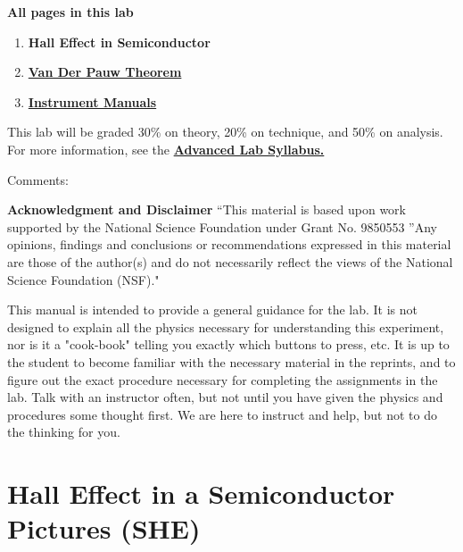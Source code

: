 \documentclass{../lab}
\begin{document}
\noindent\textbf{All pages in this lab}

\begin{enumerate}
    \item \textbf{Hall Effect in Semiconductor}

    \item \href{http://experimentationlab.berkeley.edu/node/105}{\textbf{Van Der Pauw Theorem}}
    
    \item \href{http://experimentationlab.berkeley.edu/node/106}{\textbf{Instrument Manuals}}
\end{enumerate}

This lab will be graded 30\% on theory, 20\% on technique, and 50\% on analysis. For more information, see the \href{http://experimentationlab.berkeley.edu/syllabus}{\textbf{Advanced Lab Syllabus.}}

Comments: \Feedback

\textbf{Acknowledgment and Disclaimer} ``This material is based upon work supported by the National Science Foundation under Grant No. 9850553 ''Any opinions, findings and conclusions or recommendations expressed in this material are those of the author(s) and do not necessarily reflect the views of the National Science Foundation (NSF)."

This manual is intended to provide a general guidance for the lab. It is not designed to explain all the physics necessary for understanding this experiment, nor is it a "cook-book" telling you exactly which buttons to press, etc. It is up to the student to become familiar with the necessary material in the reprints, and to figure out the exact procedure necessary for completing the assignments in the lab. Talk with an instructor often, but not until you have given the physics and procedures some thought first. We are here to instruct and help, but not to do the thinking for you.

\section{Hall Effect in a Semiconductor Pictures (SHE)}
\end{document}
